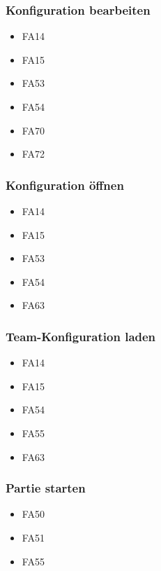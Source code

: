 \subsubsection{Konfiguration bearbeiten}
\begin{itemize} 
	\item FA14
	\item FA15 
	\item FA53 
	\item FA54 
	\item FA70 
	\item FA72 
\end{itemize}
\subsubsection{Konfiguration öffnen}
\begin{itemize} 
	\item FA14
	\item FA15 
	\item FA53 
	\item FA54 
	\item FA63 
\end{itemize}
\subsubsection{Team-Konfiguration laden}
\begin{itemize} 
	\item FA14
	\item FA15 
	\item FA54 
	\item FA55 
	\item FA63 
\end{itemize}
\subsubsection{Partie starten}
\begin{itemize} 
	\item FA50
	\item FA51 
	\item FA55 
\end{itemize}
